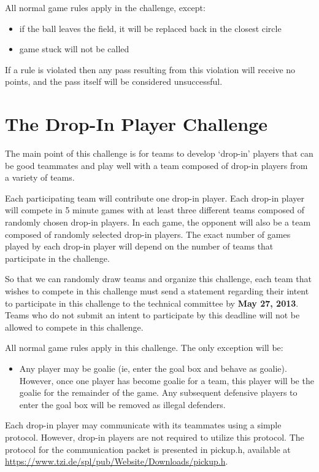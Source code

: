 \documentclass{article}
\begin{document}
All normal game rules apply in the challenge, except:
\begin{itemize}
\item if the ball leaves the field, it will be replaced back in the closest circle
\item game stuck will not be called
\end{itemize}

If a rule is violated then any pass resulting from this violation will receive no points, and the pass itself will be considered unsuccessful.


\section{The Drop-In Player Challenge}
\label{sec:dropIn}
The main point of this challenge is for teams to develop `drop-in' players that can be good teammates and play well with a team composed of drop-in players from a variety of teams.

Each participating team will contribute one drop-in player.  Each drop-in player will compete in 5 minute games with at least three different teams composed of randomly chosen drop-in players.  In each game, the opponent will also be a team composed of randomly selected drop-in players.  The exact number of games played by each drop-in player will depend on the number of teams that participate in the challenge.

So that we can randomly draw teams and organize this challenge, each team that wishes to compete in this challenge must send a statement regarding their intent to participate in this challenge to the technical committee by \textbf{May 27, 2013}.  Teams who do not submit an intent to participate by this deadline will not be allowed to compete in this challenge.

All normal game rules apply in this challenge.  The only exception will be:
\begin{itemize}
\item Any player may be goalie (ie, enter the goal box and behave as goalie).  However, once one player has become goalie for a team, this player will be the goalie for the remainder of the game.  Any subsequent defensive players to enter the goal box will be removed as illegal defenders.
\end{itemize}

Each drop-in player may communicate with its teammates using a simple protocol.  However, drop-in players are not required to utilize this protocol.  The protocol for the communication packet is presented in pickup.h, available at \url{https://www.tzi.de/spl/pub/Website/Downloads/pickup.h}.
\end{document}
